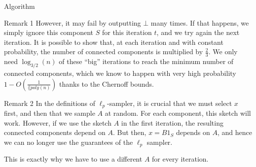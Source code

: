 \documentclass[a4paper]{article}
\begin{document}
\begin{parag}{Algorithm}
\begin{subparag}{Remark 1}
        However, it may fail by outputting $\bot$ many times. If that happens, we simply ignore this component $S$ for this iteration $t$, and we try again the next iteration. It is possible to show that, at each iteration and with constant probability, the number of connected components is multiplied by $\frac{2}{3}$. We only need $\log_{3/2}\left(n\right)$ of these ``big'' iterations to reach the minimum number of connected components, which we know to happen with very high probability $1 - O\left(\frac{1}{\lang{poly}\left(n\right)}\right)$ thanks to the Chernoff bounds.
    \end{subparag}

    \begin{subparag}{Remark 2}
        In the definitions of $\ell_p$-sampler, it is crucial that we must select $x$ first, and then that we sample $A$ at random. For each component, this sketch will work. However, if we use the sketch $A$ in the first iteration, the resulting connected components depend on $A$. But then, $x = B 1_S$ depends on $A$, and hence we can no longer use the guarantees of the $\ell_p$ sampler.

        This is exactly why we have to use a different $A$ for every iteration.
    \end{subparag}
 \end{parag}
\end{document}
